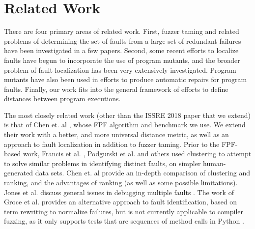 \section{Related Work}
\label{sec:related}

There are four primary areas of related work.  First, fuzzer taming and related problems of determining the set of faults from a large set of redundant failures have been investigated in a few papers.  Second, some recent efforts to localize faults have begun to incorporate the use of program mutants, and the broader problem of fault localization has been very extensively investigated.  Program mutants have also been used in efforts to produce automatic repairs for program faults.  Finally, our work fits into the general framework of efforts to define distances between program executions.
 
The most closely related work (other than the ISSRE 2018 \cite{ISSRE18Mutants} paper that we extend) is that of Chen et. al \cite{PLDI13}, whose FPF \cite{Gonzalez} algorithm and benchmark we use.  We extend their work with a better, and more universal distance metric, as well as an approach to fault localization in addition to fuzzer taming.  Prior to the FPF-based work, Francis et al. \cite{Podgurski04}, Podgurski et al. \cite{Podgurski03} and others \cite{Liu06,Liblit05} used clustering to attempt to solve similar problems in identifying distinct faults, on simpler human-generated data sets.  Chen et. al \cite{PLDI13} provide an in-depth comparison of clustering and ranking, and the advantages of ranking (as well as some possible limitations).  Jones et al. discuss general issues in debugging multiple faults \cite{Jones07}.  The work of Groce et al. \cite{OneTest} provides an alternative approach to fault identification, based on term rewriting to normalize failures, but is not currently applicable to compiler fuzzing, as it only supports tests that are sequences of method calls in Python \cite{ISSTA15,tstlsttt}.

